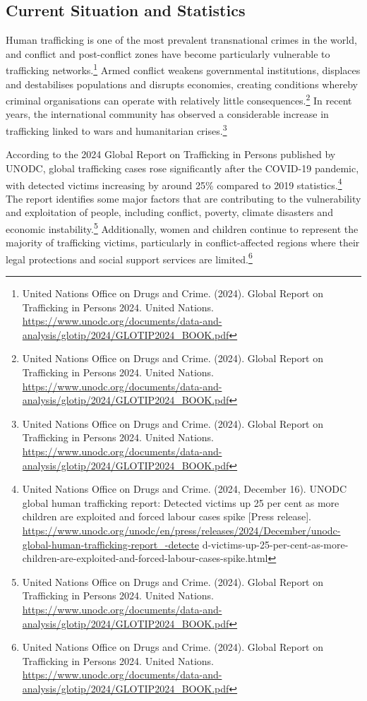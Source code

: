 \subsection{Current Situation and Statistics}

Human trafficking is one of the most prevalent transnational crimes in the world, and conflict and post-conflict zones have become particularly vulnerable to trafficking networks.\footnote{United Nations Office on Drugs and Crime. (2024). Global Report on Trafficking in Persons 2024. United Nations. \url{https://www.unodc.org/documents/data-and-analysis/glotip/2024/GLOTIP2024_BOOK.pdf}} Armed conflict weakens governmental institutions, displaces and destabilises populations and disrupts economies, creating conditions whereby criminal organisations can operate with relatively little consequences.\footnote{United Nations Office on Drugs and Crime. (2024). Global Report on Trafficking in Persons 2024. United Nations. \url{https://www.unodc.org/documents/data-and-analysis/glotip/2024/GLOTIP2024_BOOK.pdf}} In recent years, the international community has observed a considerable increase in trafficking linked to wars and humanitarian crises.\footnote{United Nations Office on Drugs and Crime. (2024). Global Report on Trafficking in Persons 2024. United Nations. \url{https://www.unodc.org/documents/data-and-analysis/glotip/2024/GLOTIP2024_BOOK.pdf}}

According to the 2024 Global Report on Trafficking in Persons published by UNODC, global trafficking cases rose significantly after the COVID-19 pandemic, with detected victims increasing by around 25\% compared to 2019 statistics.\footnote{United Nations Office on Drugs and Crime. (2024, December 16). UNODC global human trafficking report: Detected victims up 25 per cent as more children are exploited and forced labour cases spike [Press release]. \url{https://www.unodc.org/unodc/en/press/releases/2024/December/unodc-global-human-trafficking-report_-detecte} d-victims-up-25-per-cent-as-more-children-are-exploited-and-forced-labour-cases-spike.html} The report identifies some major factors that are contributing to the vulnerability and exploitation of people, including conflict, poverty, climate disasters and economic instability.\footnote{United Nations Office on Drugs and Crime. (2024). Global Report on Trafficking in Persons 2024. United Nations. \url{https://www.unodc.org/documents/data-and-analysis/glotip/2024/GLOTIP2024_BOOK.pdf}} Additionally, women and children continue to represent the majority of trafficking victims, particularly in conflict-affected regions where their legal protections and social support services are limited.\footnote{United Nations Office on Drugs and Crime. (2024). Global Report on Trafficking in Persons 2024. United Nations. \url{https://www.unodc.org/documents/data-and-analysis/glotip/2024/GLOTIP2024_BOOK.pdf}}

